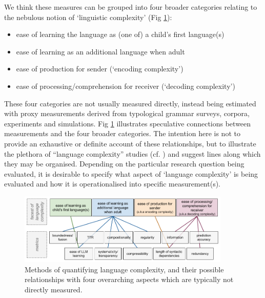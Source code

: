 \documentclass[USenglish]{article}
\begin{document}
We think these measures can be grouped into four broader categories relating to the nebulous notion of `linguistic complexity' (Fig \ref{fig:metrics_diagram}):

\begin{itemize}
\item ease of learning the language as (one of) a child's first language(s)
\item ease of learning as an additional language when adult
\item ease of production for sender (`encoding complexity')
\item ease of processing/comprehension for receiver (`decoding complexity')
\end{itemize}
\FloatBarrier

These four categories are not usually measured directly, instead being estimated with proxy measurements derived from typological grammar surveys, corpora, experiments and simulations. 
Fig \ref{fig:metrics_diagram} illustrates speculative connections between measurements and the four broader categories. 
The intention here is not to provide an exhaustive or definite account of these relationships, but to illustrate the plethora of ``language complexity'' studies (cf. \citet{bentz2023complexity}) and suggest lines along which they may be organised.
Depending on the particular research question being evaluated, it is desirable to specify what aspect of `language complexity' is being evaluated and how it is operationalised into specific measurement(s). %

\begin{figure}[ht]
    \centering
    \includegraphics[width=0.9\textwidth]{latex/graphics/ud_complexity_metrics.png} %
    \caption{Methods of quantifying language complexity, and their possible relationships with four overarching aspects which are typically not directly measured.}
    \label{fig:metrics_diagram}
\end{figure}
\FloatBarrier
\end{document}
